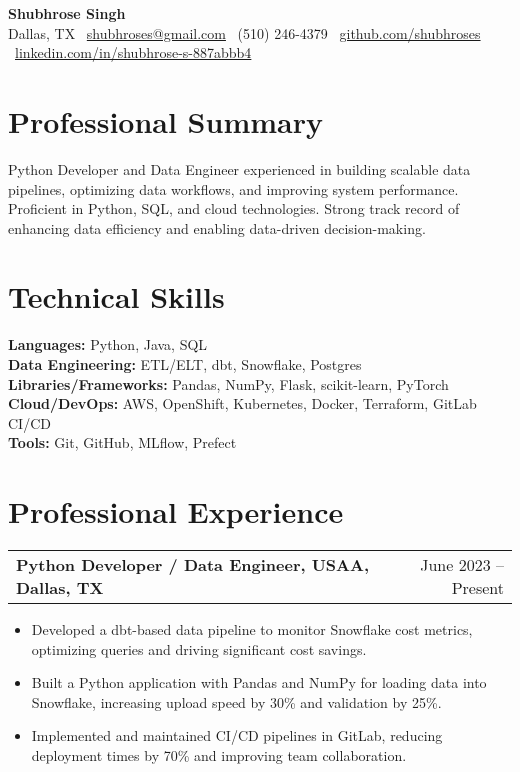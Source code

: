 \documentclass[10pt, letterpaper]{article}
\makeatletter
\newenvironment{highlights}{
    \begin{itemize}[
        topsep=0.10cm,
        parsep=0.10cm,
        partopsep=0pt,
        itemsep=0pt,
        leftmargin=10pt
    ]
}{
    \end{itemize}
}
\newenvironment{entry}[2]{
    \begin{tabular*}{\textwidth}{@{\extracolsep{\fill}} l r}
        \textbf{#1} & #2 \\
    \end{tabular*}
}{}
\makeatother
\begin{document}
    \begin{center}
        {\LARGE \textbf{Shubhrose Singh}}\\[4pt]
        Dallas, TX \textbar\ 
        \href{mailto:shubhroses@gmail.com}{shubhroses@gmail.com} \textbar\ 
        (510) 246-4379 \textbar\ 
        \href{https://github.com/shubhroses}{github.com/shubhroses} \textbar\ 
        \href{https://www.linkedin.com/in/shubhrose-s-887abbb4/}{linkedin.com/in/shubhrose-s-887abbb4}
    \end{center}

    \vspace{6pt}

    \section{Professional Summary}
    Python Developer and Data Engineer experienced in building scalable data pipelines, optimizing data workflows, and improving system performance. Proficient in Python, SQL, and cloud technologies. Strong track record of enhancing data efficiency and enabling data-driven decision-making.

    \section{Technical Skills}
    \textbf{Languages:} Python, Java, SQL \\
    \textbf{Data Engineering:} ETL/ELT, dbt, Snowflake, Postgres \\
    \textbf{Libraries/Frameworks:} Pandas, NumPy, Flask, scikit-learn, PyTorch \\
    \textbf{Cloud/DevOps:} AWS, OpenShift, Kubernetes, Docker, Terraform, GitLab CI/CD \\
    \textbf{Tools:} Git, GitHub, MLflow, Prefect

    \section{Professional Experience}

    \begin{entry}{Python Developer / Data Engineer, USAA, Dallas, TX}{June 2023 -- Present}
    \end{entry}
    \begin{highlights}
        \item Developed a dbt-based data pipeline to monitor Snowflake cost metrics, optimizing queries and driving significant cost savings.
        \item Built a Python application with Pandas and NumPy for loading data into Snowflake, increasing upload speed by 30\% and validation by 25\%.
        \item Implemented and maintained CI/CD pipelines in GitLab, reducing deployment times by 70\% and improving team collaboration.
    \end{highlights}
\end{document}
